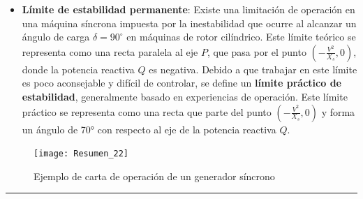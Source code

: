 \documentclass[
  11pt,
  letterpaper,
   addpoints,
   answers
  ]{exam}
\begin{document}
\begin{itemize}
    \item \textbf{Límite de estabilidad permanente}: Existe una limitación de operación en una máquina síncrona impuesta por la inestabilidad que ocurre al alcanzar un ángulo de carga \( \delta = 90^\circ \) en máquinas de rotor cilíndrico. Este límite teórico se representa como una recta paralela al eje \( P \), que pasa por el punto \( \left( -\frac{V^2}{X_s}, 0 \right) \), donde la potencia reactiva \( Q \) es negativa. Debido a que trabajar en este límite es poco aconsejable y difícil de controlar, se define un \textbf{límite práctico de estabilidad}, generalmente basado en experiencias de operación. Este límite práctico se representa como una recta que parte del punto \( \left( -\frac{V^2}{X_s}, 0 \right) \) y forma un ángulo de 70° con respecto al eje de la potencia reactiva \( Q \).
\end{itemize}

\begin{figure}[H]
  \centering
  \texttt{[image: Resumen\_22]}
  \caption{Ejemplo de carta de operación de un generador síncrono}
\end{figure}
\newpage
\hrule
\end{document}
